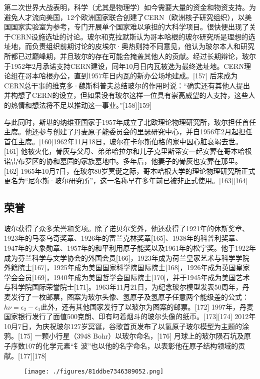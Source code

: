 第二次世界大战表明，科学（尤其是物理学）如今需要大量的资金和物资支持。为避免人才流向美国，12个欧洲国家联合创建了CERN（欧洲核子研究组织），以美国国家实验室为参考，专门开展单个国家难以承担的大科学项目。很快便出现了关于CERN设施选址的讨论。玻尔和克拉默斯认为哥本哈根的玻尔研究所是理想的选址地，而负责组织前期讨论的皮埃尔·奥热则持不同意见，他认为玻尔本人和研究所都已过巅峰期，并且玻尔的存在可能会掩盖其他人的贡献。经过长期辩论，玻尔于1952年2月承诺支持CERN建设，同年10月日内瓦被选为最终选址地。CERN理论组在哥本哈根办公，直到1957年日内瓦的新办公场地建成。[157] 后来成为CERN总干事的维克多·魏斯科普夫总结玻尔的作用时说：“确实还有其他人提出并构想了CERN的设立，但如果没有玻尔这样一位具有崇高威望的人支持，这些人的热情和想法将不足以推动这一事业。”[158][159]

与此同时，斯堪的纳维亚国家于1957年成立了北欧理论物理研究所，玻尔担任首任主席。他还参与创建了丹麦原子能委员会的里瑟研究中心，并自1956年2月起担任首任主席。[160]1962年11月18日，玻尔在卡尔斯伯格的家中因心脏衰竭去世。[161] 他被火化，骨灰与父母、弟弟哈拉尔和儿子克里斯蒂安一起安葬在哥本哈根诺雷布罗区的协和墓园的家族墓地中。多年后，他妻子的骨灰也安葬在那里。[162] 1965年10月7日，在玻尔80岁冥诞之际，哥本哈根大学的理论物理研究所正式更名为“尼尔斯·玻尔研究所”，这一名称早在多年前已被非正式使用。[163][164]
\subsection{荣誉}
玻尔获得了众多荣誉和奖项。除了诺贝尔奖外，他还获得了1921年的休斯奖章、1923年的马泰乌奇奖章、1926年的富兰克林奖章[165]、1938年的科普利奖章、1947年的大象勋章、1957年的和平利用原子能奖以及1961年的松宁奖。他于1922年成为芬兰科学与文学协会的外国会员[166]，1923年成为荷兰皇家艺术与科学学院外籍院士[167]，1925年成为美国国家科学院国际院士[168]，1926年成为英国皇家学会会员[169]，1940年成为美国哲学会国际院士[170]，并于1945年成为美国艺术与科学院国际荣誉院士[171]。1963年11月21日，为纪念玻尔模型发表50周年，丹麦发行了一枚邮票，图案为玻尔头像、氢原子及氢原子任意两个能级差的公式：$h\nu = \epsilon_2 - \epsilon_1$此外，还有其他国家发行了以玻尔为图案的邮票。[172] 1997年，丹麦国家银行发行了面值500克朗、印有叼着烟斗的玻尔头像的纸币。[173][174] 2012年10月7日，为庆祝玻尔127岁冥诞，谷歌首页发布了以氢原子玻尔模型为主题的涂鸦。[175] 一颗小行星（3948 Bohr）以玻尔命名，[176] 月球上的玻尔陨石坑及原子序数107的化学元素“钅波”也以他的名字命名，以表彰他在原子结构领域的贡献。[177][178]

\begin{figure}[ht]
\centering
\texttt{[image: ./figures/81ddbe7346389052.png]}
\caption{} \label{fig_NRSbr_12}
\end{figure}